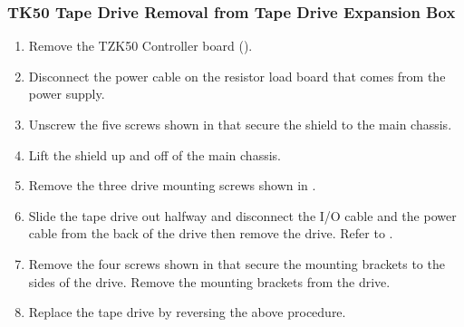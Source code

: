 \subsubsection{TK50 Tape Drive Removal from Tape Drive Expansion Box}
\begin{enumerate}
\item	Remove the TZK50 Controller board ().

\item	Disconnect the power cable on the resistor load board that comes from
		the power supply.

\item	Unscrew the five screws shown in  that secure the shield to
		the main chassis.
\newpage
\item	Lift the shield up and off of the main chassis.

\item	Remove the three drive mounting screws shown in .
\newpage

\item	Slide the tape drive out halfway and disconnect the I/O cable and the
		power cable from the back of the drive then remove the drive. Refer to .


\newpage
\item	Remove the four screws shown in  that secure the mounting
		brackets to the sides of the drive. Remove the mounting brackets from the drive.


\item	Replace the tape drive by reversing the above procedure.
\end{enumerate}

